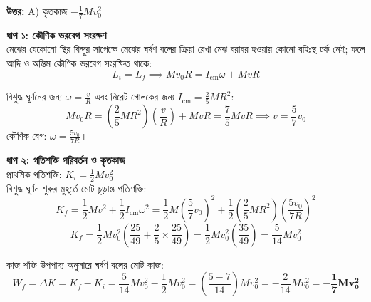 \documentclass[12pt, a4paper]{article}
\begin{document}
\vspace{0.5em}
\begin{tcolorbox}[answerbox]
    \textbf{\color{success} উত্তর:} A) কৃতকাজ $-\frac{1}{7} M v_0^2$
\end{tcolorbox}
\vspace{1em}

\begin{tcolorbox}[solutionbox={সমাধান (Solution)}]
    \noindent
    \textbf{ধাপ ১: কৌণিক ভরবেগ সংরক্ষণ} \\
    মেঝের যেকোনো স্থির বিন্দুর সাপেক্ষে মেঝের ঘর্ষণ বলের ক্রিয়া রেখা মেঝ বরাবর হওয়ায় কোনো বহিঃস্থ টর্ক নেই; ফলে আদি ও অন্তিম কৌণিক ভরবেগ সংরক্ষিত থাকে:
    \[ L_i = L_f \implies M v_0 R = I_{\text{cm}} \omega + M v R \]
    
    বিশুদ্ধ ঘূর্ণনের জন্য $\omega = \frac{v}{R}$ এবং নিরেট গোলকের জন্য $I_{\text{cm}} = \frac{2}{5} M R^2$:
    \[ M v_0 R = \left(\frac{2}{5} M R^2\right)\left(\frac{v}{R}\right) + M v R = \frac{7}{5} M v R \implies v = \frac{5}{7} v_0 \]
    কৌণিক বেগ: $\omega = \frac{5 v_0}{7 R}$।
    
    \vspace{0.5em}
    \noindent\textbf{ধাপ ২: গতিশক্তি পরিবর্তন ও কৃতকাজ} \\
    প্রাথমিক গতিশক্তি: $K_i = \frac{1}{2} M v_0^2$ \\
    বিশুদ্ধ ঘূর্ণন শুরুর মুহূর্তে মোট চূড়ান্ত গতিশক্তি:
    \[ K_f = \frac{1}{2} M v^2 + \frac{1}{2} I_{\text{cm}} \omega^2 = \frac{1}{2} M \left(\frac{5}{7} v_0\right)^2 + \frac{1}{2} \left(\frac{2}{5} M R^2\right) \left(\frac{5 v_0}{7 R}\right)^2 \]
    \[ K_f = \frac{1}{2} M v_0^2 \left( \frac{25}{49} + \frac{2}{5} \times \frac{25}{49} \right) = \frac{1}{2} M v_0^2 \left(\frac{35}{49}\right) = \frac{5}{14} M v_0^2 \]
    
    কাজ-শক্তি উপপাদ্য অনুসারে ঘর্ষণ বলের মোট কাজ:
    \[ W_f = \Delta K = K_f - K_i = \frac{5}{14} M v_0^2 - \frac{1}{2} M v_0^2 = \left(\frac{5 - 7}{14}\right) M v_0^2 = -\frac{2}{14} M v_0^2 = \mathbf{-\frac{1}{7} M v_0^2} \]
\end{tcolorbox}

\newpage
\end{document}
